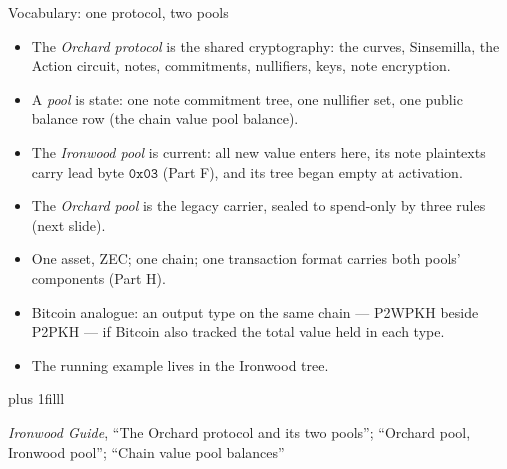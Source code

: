 \documentclass[aspectratio=169,11pt]{beamer}
\newcommand{\src}[1]{\par\vskip0pt plus 1filll
  {\fontsize{6}{7.2}\selectfont\color{arbdim}\raggedright #1\par}}
\begin{document}
\begin{frame}{Vocabulary: one protocol, two pools}
\begin{itemize}
  \item The \emph{Orchard protocol} is the shared cryptography: the
    curves, Sinsemilla, the Action circuit, notes, commitments,
    nullifiers, keys, note encryption.
  \item A \emph{pool} is state: one note commitment tree, one nullifier
    set, one public balance row (the chain value pool balance).
  \item The \emph{Ironwood pool} is current: all new value enters here,
    its note plaintexts carry lead byte $\mathtt{0x03}$ (Part F), and
    its tree began empty
    at activation.
  \item The \emph{Orchard pool} is the legacy carrier, sealed to
    spend-only by three rules (next slide).
  \item One asset, ZEC; one chain; one transaction format carries both
    pools' components (Part H).
  \item Bitcoin analogue: an output type on the same chain ---
    P2WPKH beside P2PKH --- if Bitcoin also tracked the total value
    held in each type.
  \item The running example lives in the Ironwood tree.
\end{itemize}
\src{\emph{Ironwood Guide}, ``The Orchard protocol and its two pools'';
  ``Orchard pool, Ironwood pool''; ``Chain value pool balances''}
\end{frame}
\end{document}
